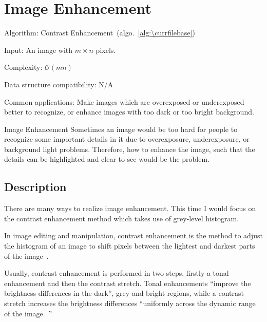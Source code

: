 \documentclass[catalog.tex]{subfiles}
\begin{document}
%
%

\def\pbname{Image Enhancement} %

\section{\pbname} 

\begin{overview}
\item [Algorithm:] Contrast Enhancement~(algo.~\ref{alg:\currfilebase}) 
\item [Input:] An image with $m\times n$ pixels.
\item [Complexity:] $\mathcal{O}(mn)$
\item [Data structure compatibility:] N/A
\item [Common applications:] Make images which are overexposed or underexposed better to recognize, or enhance images with too dark or too bright background.
\end{overview}


\begin{problem}{\pbname}
	Sometimes an image would be too hard for people to recognize some important details in it due to overexposure, underexposure, or background light problems. Therefore, how to enhance the image, such that the details can be highlighted and clear to see would be the problem.
\end{problem}


\subsection*{Description}
There are many ways to realize image enhancement. This time I would focus on the contrast enhancement method which takes use of grey-level histogram. 

In image editing and manipulation, contrast enhancement is the method to adjust the histogram of an image to shift pixels between the lightest and darkest parts of the image~\cite{printwiki}.

Usually, contrast enhancement is performed in two steps, firstly a tonal enhancement and then the contrast stretch. Tonal enhancements ``improve the brightness differences in the dark'', grey and bright regions, while a contrast stretch increases the brightness differences ``uniformly across the dynamic range of the image.~\cite{fiete_2010}''
\end{document}
